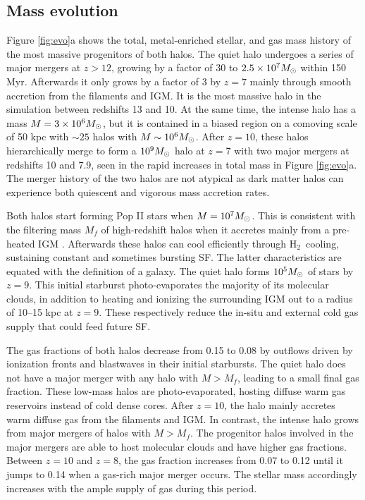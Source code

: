 \documentclass[apjl]{emulateapj}
\newcommand{\li}{\noindent$\bullet$\quad}
\newcommand{\Ms}{\ifmmode{M_\odot}\else{$M_\odot$}\fi}
\newcommand{\hh}{H$_2$}
\begin{document}
\subsection{Mass evolution}
\label{sec:halo}


Figure \ref{fig:evo}a shows the total, metal-enriched stellar, and gas
mass history of the most massive progenitors of both halos.  The quiet
halo undergoes a series of major mergers at $z > 12$, growing by a
factor of 30 to $2.5 \times 10^7 \Ms$ within 150 Myr.  Afterwards it
only grows by a factor of 3 by $z=7$ mainly through smooth accretion
from the filaments and IGM.  It is the most massive halo in the
simulation between redshifts 13 and 10.  At the same time, the intense
halo has a mass $M = 3 \times 10^6 \Ms$, but it is contained in a
biased region on a comoving scale of 50 kpc with $\sim25$ halos with
$M \sim 10^6 \Ms$.  After $z=10$, these halos hierarchically merge to
form a $10^9 \Ms$ halo at $z=7$ with two major mergers at redshifts 10
and 7.9, seen in the rapid increases in total mass in Figure
\ref{fig:evo}a.  The merger history of the two halos are not atypical
as dark matter halos can experience both quiescent and vigorous mass
accretion rates.

Both halos start forming Pop II stars when $M = 10^7 \Ms$.  This is
consistent with the filtering mass $M_f$ of high-redshift halos when
it accretes mainly from a pre-heated IGM \citep{gnedin98, gnedin00,
  Wise08_Gal}.  Afterwards these halos can cool efficiently through
\hh~cooling, sustaining constant and sometimes bursting SF.  The
latter characteristics are equated with the definition of a galaxy.
The quiet halo forms $10^5 \Ms$ of stars by $z=9$.  This initial
starburst photo-evaporates the majority of its molecular clouds, in
addition to heating and ionizing the surrounding IGM out to a radius
of 10--15 kpc at $z=9$.  These respectively reduce the in-situ and
external cold gas supply that could feed future SF.

The gas fractions of both halos decrease from 0.15 to 0.08 by outflows
driven by ionization fronts and blastwaves in their initial
starbursts.  The quiet halo does not have a major merger with any halo
with $M > M_f$, leading to a small final gas fraction.  These low-mass
halos are photo-evaporated, hosting diffuse warm gas reservoirs
instead of cold dense cores.  After $z=10$, the halo mainly accretes
warm diffuse gas from the filaments and IGM.  In contrast, the intense
halo grows from major mergers of halos with $M > M_f$.  The progenitor
halos involved in the major mergers are able to host molecular clouds
and have higher gas fractions.  Between $z=10$ and $z=8$, the gas
fraction increases from 0.07 to 0.12 until it jumps to 0.14 when a
gas-rich major merger occurs.  The stellar mass accordingly increases
with the ample supply of gas during this period.  
\end{document}
